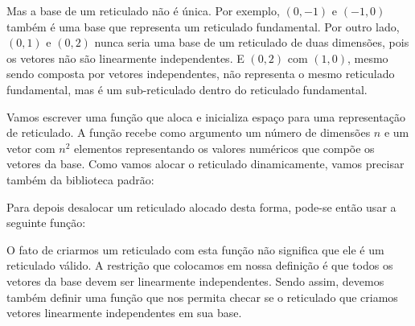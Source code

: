 Mas a base de um reticulado não é única. Por exemplo, $(0, -1)$ e
$(-1, 0)$ também é uma base que representa um reticulado
fundamental. Por outro lado, $(0, 1)$ e $(0,2)$ nunca seria uma base
de um reticulado de duas dimensões, pois os vetores não são
linearmente independentes. E $(0, 2)$ com $(1, 0)$, mesmo sendo
composta por vetores independentes, não representa o mesmo reticulado
fundamental, mas é um sub-reticulado dentro do reticulado
fundamental.

Vamos escrever uma função que aloca e inicializa espaço para uma
representação de reticulado. A função recebe como argumento um número
de dimensões $n$ e um vetor com $n^2$ elementos representando os
valores numéricos que compõe os vetores da base. Como vamos alocar o
reticulado dinamicamente, vamos precisar também da biblioteca padrão:


Para depois desalocar um reticulado alocado desta forma, pode-se então
usar a seguinte função:


O fato de criarmos um reticulado com esta função não significa que ele
é um reticulado válido. A restrição que colocamos em nossa definição é
que todos os vetores da base devem ser linearmente
independentes. Sendo assim, devemos também definir uma função que nos
permita checar se o reticulado que criamos vetores linearmente
independentes em sua base.


